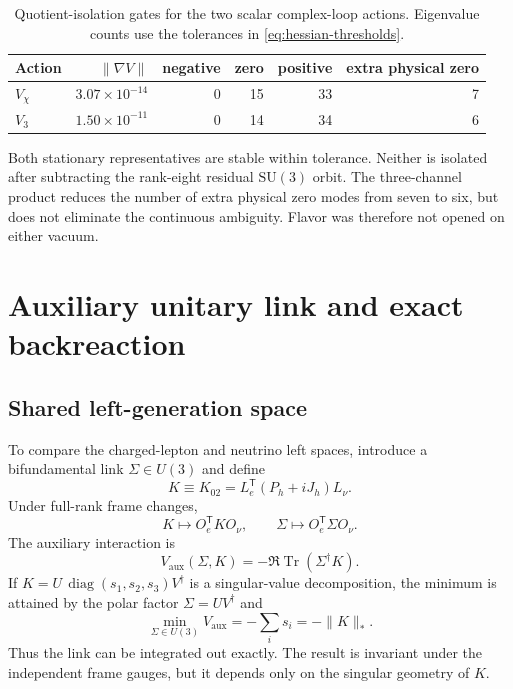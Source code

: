 \documentclass[11pt]{article}
\newcommand{\Tr}{\operatorname{Tr}}
\newcommand{\diag}{\operatorname{diag}}
\newcommand{\SU}{\mathrm{SU}}
\begin{document}
\begin{table}[t]
\centering
\caption{Quotient-isolation gates for the two scalar complex-loop actions.  Eigenvalue counts use the tolerances in \cref{eq:hessian-thresholds}.}
\label{tab:loop-gate}
\begin{tabular}{@{}lrrrrr@{}}
\toprule
Action & $\|\nabla V\|$ & negative & zero & positive & extra physical zero \\
\midrule
$V_\chi$ & $3.07\times10^{-14}$ & 0 & 15 & 33 & 7 \\
$V_3$    & $1.50\times10^{-11}$ & 0 & 14 & 34 & 6 \\
\bottomrule
\end{tabular}
\end{table}

Both stationary representatives are stable within tolerance.  Neither is isolated after subtracting the rank-eight residual $\SU(3)$ orbit.  The three-channel product reduces the number of extra physical zero modes from seven to six, but does not eliminate the continuous ambiguity.  Flavor was therefore not opened on either vacuum.

\section{Auxiliary unitary link and exact backreaction}
\label{sec:link}

\subsection{Shared left-generation space}

To compare the charged-lepton and neutrino left spaces, introduce a bifundamental link $\Sigma\in U(3)$ and define
\begin{equation}
  K\equiv K_{02}=L_e^{\mathsf T}(P_h+iJ_h)L_\nu.
  \label{eq:leftK}
\end{equation}
Under full-rank frame changes,
\begin{equation}
  K\mapsto O_e^{\mathsf T}KO_\nu,
  \qquad
  \Sigma\mapsto O_e^{\mathsf T}\Sigma O_\nu.
\end{equation}
The auxiliary interaction is
\begin{equation}
  V_{\mathrm{aux}}(\Sigma,K)=-\Re\Tr(\Sigma^\dagger K).
  \label{eq:vaux}
\end{equation}
If $K=U\,\diag(s_1,s_2,s_3)V^\dagger$ is a singular-value decomposition, the minimum is attained by the polar factor $\Sigma=UV^\dagger$ and
\begin{equation}
  \min_{\Sigma\in U(3)}V_{\mathrm{aux}}=-\sum_i s_i=-\|K\|_*.
  \label{eq:nuclear}
\end{equation}
Thus the link can be integrated out exactly.  The result is invariant under the independent frame gauges, but it depends only on the singular geometry of $K$.
\end{document}
